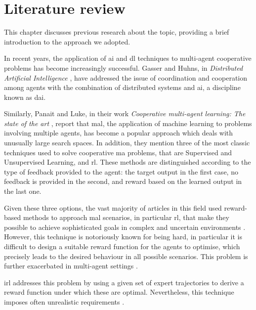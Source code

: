\setcounter{chapter}{0}
\chapter{Literature review}
\label{chap:stateoftheart}
This chapter discusses previous research about the topic, providing a brief 
introduction to the approach we adopted.


\bigskip
In recent years, the application of \gls{ai} and \gls{dl} techniques to multi-agent 
cooperative problems has become increasingly successful.
Gasser and Huhns, in \emph{Distributed Artificial Intelligence} 
\cite[][]{gasser2014distributed}, have addressed the issue of coordination and 
cooperation among agents with the combination of distributed systems and 
\gls{ai}, a discipline known as \gls{dai}. 

Similarly, Panait and Luke, in their work \emph{Cooperative multi-agent learning: 
The state of the art} \cite[][]{panait2005cooperative}, report that \gls{mal}, the 
application of machine learning to problems involving multiple agents, has 
become a popular approach which deals with unusually large search spaces. 
In addition, they mention three of the most classic techniques used to solve 
cooperative \gls{ma} problems, that are Supervised and Unsupervised Learning, 
and \gls{rl}. These methods are distinguished according to the type of feedback 
provided to the agent: the target output in the first case, no feedback is provided 
in the second, and reward based on the learned output in the last one.

Given these three options, the vast majority of articles in this field used 
reward-based methods to approach \gls{mal} scenarios, in particular \gls{rl}, that 
make they possible to achieve sophisticated goals in complex and uncertain 
environments \cite[][]{oliehoek2012decentralised}. 
However, this technique is notoriously known for being hard, in particular it is 
difficult to design a suitable reward function for the agents to optimise, which 
precisely leads to the desired behaviour in all possible scenarios. This problem is 
further exacerbated in multi-agent settings \cite[][]{hadfield2017inverse, 
oliehoek2012decentralised}.

\gls{irl} addresses this problem by using a given set of expert trajectories to 
derive a reward function under which these are optimal. 
Nevertheless, this technique imposes often unrealistic requirements 
\cite[][]{vsovsic2016inverse}.

